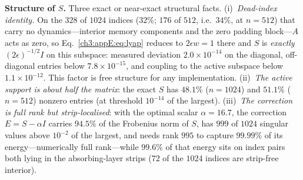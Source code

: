 \noindent\textbf{Structure of $S$.}  Three exact or near-exact structural
facts.  (i)~\emph{Dead-index identity.}  On the $328$ of $1024$
indices ($32\%$; $176$ of $512$, i.e.\ $34\%$, at $n=512$) that carry
no dynamics---interior memory components and the zero padding
block---$A$ acts as zero, so Eq.~\eqref{ch3:appE:eq:lyap} reduces to
$2\epsilon w=1$ there and $S$ is \emph{exactly}
$(2\epsilon)^{-1/2}I$ on this subspace: measured deviation
$2.0\times10^{-14}$ on the diagonal, off-diagonal entries below
$7.8\times10^{-15}$, and coupling to the active subspace below
$1.1\times10^{-12}$.  This factor is free structure for any
implementation.  (ii)~\emph{The active support is about half the
matrix}: the exact $S$ has $48.1\%$ ($n=1024$) and $51.1\%$
($n=512$) nonzero entries (at threshold $10^{-14}$ of the largest).
(iii)~\emph{The correction is full rank but strip-localised}: with the
optimal scalar $\alpha=16.7$, the correction $E=S-\alpha I$ carries
$94.5\%$ of the Frobenius norm of $S$, has $999$ of $1024$ singular
values above $10^{-2}$ of the largest, and needs rank $995$ to capture
$99.99\%$ of its energy---numerically full rank---while $99.6\%$ of
that energy sits on index pairs both lying in the absorbing-layer
strips ($72$ of the $1024$ indices are strip-free interior).


